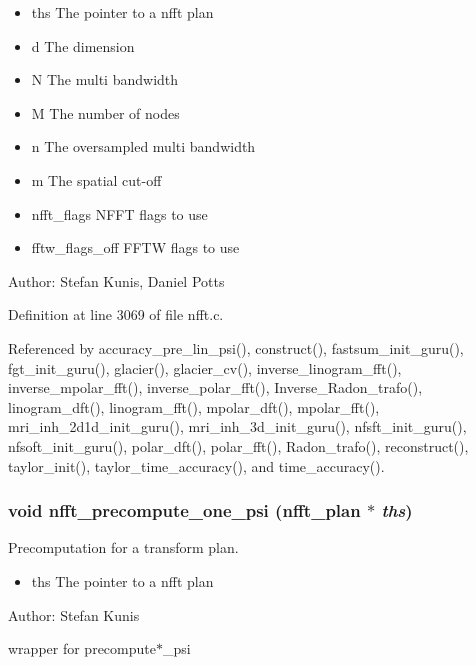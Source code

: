 \begin{itemize}
\item ths The pointer to a nfft plan \item d The dimension \item N The multi bandwidth \item M The number of nodes \item n The oversampled multi bandwidth \item m The spatial cut-off \item nfft\_\-flags NFFT flags to use \item fftw\_\-flags\_\-off FFTW flags to use\end{itemize}
\begin{Desc}
\item[Author:]Stefan Kunis, Daniel Potts \end{Desc}


Definition at line 3069 of file nfft.c.

Referenced by accuracy\_\-pre\_\-lin\_\-psi(), construct(), fastsum\_\-init\_\-guru(), fgt\_\-init\_\-guru(), glacier(), glacier\_\-cv(), inverse\_\-linogram\_\-fft(), inverse\_\-mpolar\_\-fft(), inverse\_\-polar\_\-fft(), Inverse\_\-Radon\_\-trafo(), linogram\_\-dft(), linogram\_\-fft(), mpolar\_\-dft(), mpolar\_\-fft(), mri\_\-inh\_\-2d1d\_\-init\_\-guru(), mri\_\-inh\_\-3d\_\-init\_\-guru(), nfsft\_\-init\_\-guru(), nfsoft\_\-init\_\-guru(), polar\_\-dft(), polar\_\-fft(), Radon\_\-trafo(), reconstruct(), taylor\_\-init(), taylor\_\-time\_\-accuracy(), and time\_\-accuracy().\hypertarget{group__nfft_gfd7b278b6ed04d929212b4807dd195f0}{
\subsubsection{\setlength{\rightskip}{0pt plus 5cm}void nfft\_\-precompute\_\-one\_\-psi ({\bf nfft\_\-plan} $\ast$ {\em ths})}}
\label{group__nfft_gfd7b278b6ed04d929212b4807dd195f0}


Precomputation for a transform plan. 

\begin{itemize}
\item ths The pointer to a nfft plan\end{itemize}
\begin{Desc}
\item[Author:]Stefan Kunis\end{Desc}
wrapper for precompute$\ast$\_\-psi

